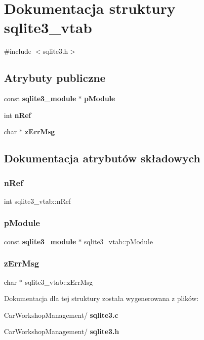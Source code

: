 \section{Dokumentacja struktury sqlite3\+\_\+vtab}
\label{structsqlite3__vtab}


{\ttfamily \#include $<$sqlite3.\+h$>$}

\subsection*{Atrybuty publiczne}
\begin{DoxyCompactItemize}
\item 
const \textbf{ sqlite3\+\_\+module} $\ast$ \textbf{ p\+Module}
\item 
int \textbf{ n\+Ref}
\item 
char $\ast$ \textbf{ z\+Err\+Msg}
\end{DoxyCompactItemize}


\subsection{Dokumentacja atrybutów składowych}
\mbox{\label{structsqlite3__vtab_ab3c80d385849bdd82363a0df7d6fcba8}} 
\subsubsection{nRef}
{\footnotesize\ttfamily int sqlite3\+\_\+vtab\+::n\+Ref}

\mbox{\label{structsqlite3__vtab_acf0d906e36b113669eaa883c5f8b5ba0}} 
\subsubsection{pModule}
{\footnotesize\ttfamily const \textbf{ sqlite3\+\_\+module} $\ast$ sqlite3\+\_\+vtab\+::p\+Module}

\mbox{\label{structsqlite3__vtab_a47331586775d674ae951b07ebb902fca}} 
\subsubsection{zErrMsg}
{\footnotesize\ttfamily char $\ast$ sqlite3\+\_\+vtab\+::z\+Err\+Msg}



Dokumentacja dla tej struktury została wygenerowana z plików\+:\begin{DoxyCompactItemize}
\item 
Car\+Workshop\+Management/\textbf{ sqlite3.\+c}\item 
Car\+Workshop\+Management/\textbf{ sqlite3.\+h}\end{DoxyCompactItemize}
